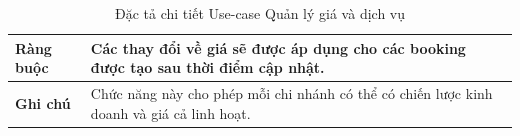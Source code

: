 \begin{table}[H]
\begin{tabular}{|p{4cm}|p{10cm}|}
\textbf{Ràng buộc} 
& Các thay đổi về giá sẽ được áp dụng cho các booking được tạo sau thời điểm cập nhật. \\ 
\hline

\textbf{Ghi chú} 
& Chức năng này cho phép mỗi chi nhánh có thể có chiến lược kinh doanh và giá cả linh hoạt. \\ 
\hline
\end{tabular}
\caption{Đặc tả chi tiết Use-case Quản lý giá và dịch vụ}
\label{tab:pricing-management-spec}
\end{table}


